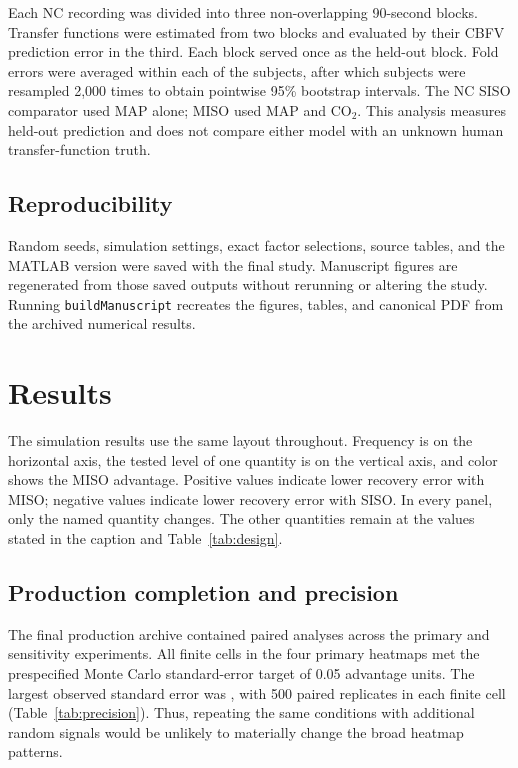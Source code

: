 \documentclass[12pt]{article}
\begin{document}
Each NC recording was divided into three non-overlapping 90-second blocks.
Transfer functions were estimated from two blocks and evaluated by their CBFV
prediction error in the third. Each block served once as the held-out block.
Fold errors were averaged within each of the \NCSubjectCount{} subjects, after
which subjects were resampled 2,000 times to obtain pointwise 95\% bootstrap
intervals. The NC SISO comparator used MAP alone; MISO used MAP and CO$_2$.
This analysis measures held-out prediction and does not compare either model
with an unknown human transfer-function truth.

\subsection{Reproducibility}

Random seeds, simulation settings, exact factor selections, source tables, and
the MATLAB version were saved with the final study. Manuscript figures are
regenerated from those saved outputs without rerunning or altering the study.
Running \texttt{buildManuscript} recreates the figures, tables, and canonical
PDF from the archived numerical results.

\section{Results}

The simulation results use the same layout throughout. Frequency is on the
horizontal axis, the tested level of one quantity is on the vertical axis, and
color shows the MISO advantage. Positive values indicate lower recovery error
with MISO; negative values indicate lower recovery error with SISO. In every
panel, only the named quantity changes. The other quantities remain at the
values stated in the caption and Table~\ref{tab:design}.

\subsection{Production completion and precision}

The final production archive contained \SimulationTotalAnalyses{} paired
analyses across the primary and sensitivity experiments. All finite cells in
the four primary heatmaps met the prespecified Monte Carlo standard-error
target of 0.05 advantage units. The largest observed standard error was
\MaximumMonteCarloSE{}, with 500 paired replicates in each finite cell
(Table~\ref{tab:precision}). Thus, repeating the same conditions with additional
random signals would be unlikely to materially change the broad heatmap
patterns.
\end{document}
